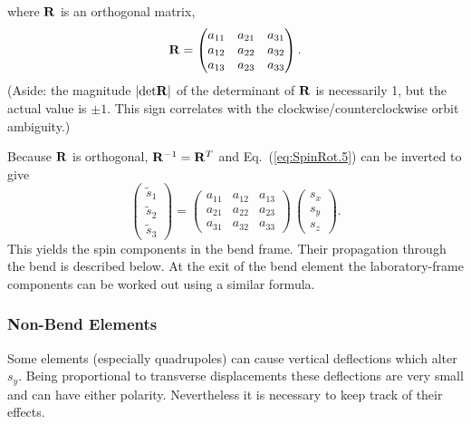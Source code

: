 \documentclass[]{article}
\begin{document}
%
where ${\bf R}$ is an orthogonal matrix,
%
\begin{equation}
{\bf R}
 =
\begin{pmatrix} a_{11} & a_{21} &  a_{31}  \\  
                a_{12} & a_{22} &  a_{32}  \\  
                a_{13} & a_{23} &  a_{33}  
\end{pmatrix}.
\label{eq:SpinRot.6}
\end{equation}
%
(Aside: the magnitude $|{\rm det}{\bf R}|$ of the determinant of 
${\bf R}$ is necessarily 1, but the actual value is $\pm1$.
This sign correlates with the clockwise/counterclockwise
orbit ambiguity.)

Because ${\bf R}$ is orthogonal, ${\bf R}^{-1}={\bf R}^T$ and  
Eq.~(\ref{eq:SpinRot.5}) can be inverted to give 
%
\begin{equation}
\begin{pmatrix} \tilde s_1 \\  \tilde s_2 \\  \tilde s_3 \end{pmatrix}
 =
\begin{pmatrix} a_{11} & a_{12} &  a_{13}  \\  
                a_{21} & a_{22} &  a_{23}  \\  
                a_{31} & a_{32} &  a_{33}
\end{pmatrix} \,
\begin{pmatrix} s_x \\ s_y \\ s_z \end{pmatrix}.
\label{eq:SpinRot.7}
\end{equation}
%
This yields the spin components in the bend frame. Their propagation
through the bend is described below. At the exit of the bend element
the laboratory-frame components can be worked out using a similar 
formula.

\subsubsection{Non-Bend Elements}
Some elements (especially quadrupoles)
can cause vertical deflections which alter $s_y$.
Being proportional
to transverse displacements these deflections are
very small and can have either polarity.
Nevertheless it is necessary to keep track of their
effects. 
\end{document}

